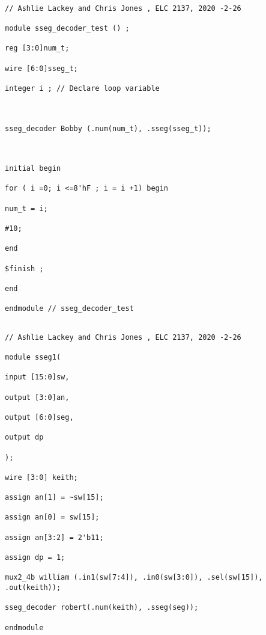 \documentclass[11pt]{article}
\begin{document}
\begin{lstlisting}[style=Verilog,caption=sseg Decoder Testbench Code,label=code:ex ]

// Ashlie Lackey and Chris Jones , ELC 2137, 2020 -2-26

module sseg_decoder_test () ;

reg [3:0]num_t;

wire [6:0]sseg_t;

integer i ; // Declare loop variable



sseg_decoder Bobby (.num(num_t), .sseg(sseg_t));



initial begin

for ( i =0; i <=8'hF ; i = i +1) begin

num_t = i;

#10;

end

$finish ;

end

endmodule // sseg_decoder_test

\end{lstlisting}



\begin{lstlisting}[style=Verilog,caption=Top-level Module Code,label=code:ex ]

// Ashlie Lackey and Chris Jones , ELC 2137, 2020 -2-26

module sseg1(

input [15:0]sw,

output [3:0]an,

output [6:0]seg,

output dp

);

wire [3:0] keith;

assign an[1] = ~sw[15];

assign an[0] = sw[15];

assign an[3:2] = 2'b11;

assign dp = 1;

mux2_4b william (.in1(sw[7:4]), .in0(sw[3:0]), .sel(sw[15]), .out(keith));

sseg_decoder robert(.num(keith), .sseg(seg));

endmodule

\end{lstlisting}
\end{document}
